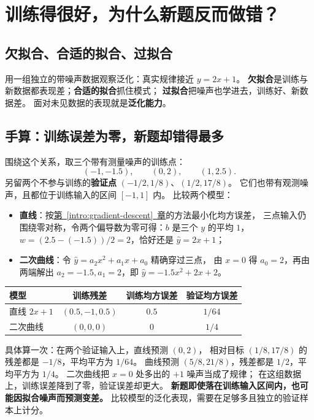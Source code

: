 \chapterrule
\section{训练得很好，为什么新题反而做错？}
\label{intro:generalization}

\subsection{欠拟合、合适的拟合、过拟合}
\label{concept:underfitting}
\label{concept:overfitting}
\label{concept:generalization}

用一组独立的带噪声数据观察泛化：真实规律接近 $y=2x+1$。
\textbf{欠拟合}是训练与新数据都表现差；\textbf{合适的拟合}抓住模式；
\textbf{过拟合}把噪声也学进去，训练好、新数据差。
面对未见数据的表现就是\textbf{泛化能力}。



\subsection{手算：训练误差为零，新题却错得最多}

围绕这个关系，取三个带有测量噪声的训练点：
\[
(-1,-1.5),\qquad(0,2),\qquad(1,2.5).
\]
另留两个不参与训练的\textbf{验证点} $(-1/2,1/8)$、$(1/2,17/8)$。
它们也带有观测噪声，且都位于训练输入的区间 $[-1,1]$ 内。
比较两个模型：
\begin{itemize}
\item \textbf{直线}：按\hyperref[intro:gradient-descent]{第~\ref*{intro:gradient-descent}~章}的方法最小化均方误差，
三点输入仍围绕零对称，令两个偏导数为零可得：$b$ 是三个 $y$ 的平均 $1$，
$w=(2.5-(-1.5))/2=2$，恰好还是 $\widehat{y}=2x+1$；
\item \textbf{二次曲线}：令 $\widehat{y}=a_2x^2+a_1x+a_0$ 精确穿过三点，
由 $x=0$ 得 $a_0=2$，再由两端解出 $a_2=-1.5,a_1=2$，即 $\widehat{y}=-1.5x^2+2x+2$。
\end{itemize}
\begin{center}\small
{}
\begin{tabular}{lccc}
\toprule
模型 & 训练残差 & 训练均方误差 & 验证均方误差\\\midrule
直线 $2x+1$ & $(0.5,-1,0.5)$ & $0.5$ & $1/64$\\
二次曲线 & $(0,0,0)$ & $0$ & $1/4$\\
\bottomrule
\end{tabular}
\end{center}
具体算一次：在两个验证输入上，直线预测 $(0,2)$，
相对目标 $(1/8,17/8)$ 的残差都是 $-1/8$，平均平方为 $1/64$。
曲线预测 $(5/8,21/8)$，残差都是 $1/2$，平均平方为 $1/4$。
二次曲线把 $x=0$ 处多出的 $+1$ 噪声当成了规律；
在这组数据上，训练误差降到了零，验证误差却更大。
\textbf{新题即使落在训练输入区间内，也可能因拟合噪声而预测变差。}
比较模型的泛化表现，需要在足够多且独立的验证样本上计分。

